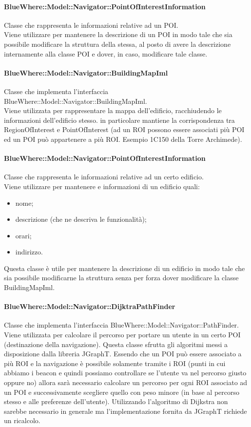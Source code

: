 \documentclass[../SpecificaTecnica.tex]{subfiles}
\begin{document}
				\paragraph{BlueWhere::Model::Navigator::PointOfInterestInformation}
					Classe che rappresenta le informazioni relative ad un POI. \\
					Viene utilizzare per mantenere la descrizione di un POI in modo tale che sia possibile modificare la struttura della stessa, al posto di avere la descrizione internamente alla classe POI e dover, in caso, modificare tale classe.
				\paragraph{BlueWhere::Model::Navigator::BuildingMapIml}
					Classe che implementa l'interfaccia BlueWhere::Model::Navigator::BuildingMapIml. \\
					Viene utilizzata per rappresentare la mappa dell'edificio, racchiudendo le informazioni dell'edificio stesso. in particolare mantiene la corrispondenza tra RegionOfInterest e PointOfInterest (ad un ROI possono essere associati più POI ed un POI può appartenere a più ROI. Esempio 1C150 della Torre Archimede).
				\paragraph{BlueWhere::Model::Navigator::PointOfInterestInformation}
					Classe che rappresenta le informazioni relative ad un certo edificio. \\
					Viene utilizzare per mantenere e informazioni di un edificio quali:
					\begin{itemize}
						\item nome;
						\item descrizione (che ne descriva le funzionalità);
						\item orari;
						\item indirizzo.
					\end{itemize}
					Questa classe è utile per mantenere la descrizione di un edificio in modo tale che sia possibile modificarne la struttura senza per forza dover modificare la classe BuildingMapIml. 
				\paragraph{BlueWhere::Model::Navigator::DijktraPathFinder}
					Classe che implementa l'interfaccia BlueWhere::Model::Navigator::PathFinder. \\
					Viene utilizzata per calcolare il percorso per portare un utente in un certo POI (destinazione della navigazione). Questa classe sfrutta gli algoritmi messi a disposizione dalla libreria JGraphT. Essendo che un POI può essere associato a più ROI e la navigazione è possibile solamente tramite i ROI (punti in cui abbiamo i beacon e quindi possiamo controllare se l'utente va nel percorso giusto oppure no) allora sarà necessario calcolare un percorso per ogni ROI associato ad un POI e successivamente scegliere quello con peso minore (in base al percorso stesso e alle preferenze dell'utente). Utilizzando l'algoritmo di Dijkstra non sarebbe necessario in generale ma l'implementazione fornita da JGraphT richiede un ricalcolo.
\end{document}
